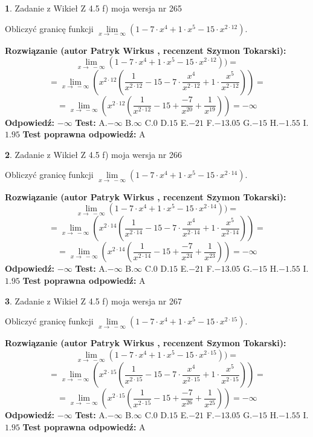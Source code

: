 \documentclass[12pt, a4paper]{article}
\theoremstyle{definition} %
\newtheorem{zad}{}
\newcommand{\zadStart}[1]{\begin{zad}#1\newline}
\newcommand{\zadStop}{\end{zad}}
\newcommand{\rozwStart}[2]{\noindent \textbf{Rozwiązanie (autor #1 , recenzent #2): }\newline}
\newcommand{\rozwStop}{\newline}
\newcommand{\odpStart}{\noindent \textbf{Odpowiedź:}\newline}
\newcommand{\odpStop}{\newline}
\newcommand{\testStart}{\noindent \textbf{Test:}\newline}
\newcommand{\testStop}{\newline}
\newcommand{\kluczStart}{\noindent \textbf{Test poprawna odpowiedź:}\newline}
\newcommand{\kluczStop}{\newline}
\begin{document}
\zadStart{Zadanie z Wikieł Z 4.5 f) moja wersja nr 265}


Obliczyć granicę funkcji  $\lim\limits_{x\to\ -\infty}(1 - 7 \cdot x^{4}+1 \cdot x^{5}- 15 \cdot x^{2\cdot12})$.
\zadStop
\rozwStart{Patryk Wirkus}{Szymon Tokarski}
$$\lim\limits_{x\to\ -\infty}(1 - 7 \cdot x^{4}+1 \cdot x^{5}- 15 \cdot x^{2\cdot12}))=$$
$$=\lim\limits_{x\to\ -\infty}(x^{2\cdot12}(\frac{1}{x^{2\cdot12}}-15 -7 \cdot \frac{x^{4}}{x^{2\cdot12}}+1 \cdot \frac{x^{5}}{x^{2\cdot12}}))=$$
$$=\lim\limits_{x\to\ -\infty}(x^{2\cdot12}(\frac{1}{x^{2\cdot12}}-15 + \frac{-7}{x^{20}}+ \frac{1}{x^{19}}))=-\infty$$
\rozwStop
\odpStart
$-\infty$
\odpStop
\testStart
A.$-\infty$ B.$\infty$ C.$0$ D.$15$ E.$-21$
F.$-13.05$ G.$-15$
H.$-1.55$
I.$1.95$
\testStop
\kluczStart
A
\kluczStop



\zadStart{Zadanie z Wikieł Z 4.5 f) moja wersja nr 266}


Obliczyć granicę funkcji  $\lim\limits_{x\to\ -\infty}(1 - 7 \cdot x^{4}+1 \cdot x^{5}- 15 \cdot x^{2\cdot14})$.
\zadStop
\rozwStart{Patryk Wirkus}{Szymon Tokarski}
$$\lim\limits_{x\to\ -\infty}(1 - 7 \cdot x^{4}+1 \cdot x^{5}- 15 \cdot x^{2\cdot14}))=$$
$$=\lim\limits_{x\to\ -\infty}(x^{2\cdot14}(\frac{1}{x^{2\cdot14}}-15 -7 \cdot \frac{x^{4}}{x^{2\cdot14}}+1 \cdot \frac{x^{5}}{x^{2\cdot14}}))=$$
$$=\lim\limits_{x\to\ -\infty}(x^{2\cdot14}(\frac{1}{x^{2\cdot14}}-15 + \frac{-7}{x^{24}}+ \frac{1}{x^{23}}))=-\infty$$
\rozwStop
\odpStart
$-\infty$
\odpStop
\testStart
A.$-\infty$ B.$\infty$ C.$0$ D.$15$ E.$-21$
F.$-13.05$ G.$-15$
H.$-1.55$
I.$1.95$
\testStop
\kluczStart
A
\kluczStop



\zadStart{Zadanie z Wikieł Z 4.5 f) moja wersja nr 267}


Obliczyć granicę funkcji  $\lim\limits_{x\to\ -\infty}(1 - 7 \cdot x^{4}+1 \cdot x^{5}- 15 \cdot x^{2\cdot15})$.
\zadStop
\rozwStart{Patryk Wirkus}{Szymon Tokarski}
$$\lim\limits_{x\to\ -\infty}(1 - 7 \cdot x^{4}+1 \cdot x^{5}- 15 \cdot x^{2\cdot15}))=$$
$$=\lim\limits_{x\to\ -\infty}(x^{2\cdot15}(\frac{1}{x^{2\cdot15}}-15 -7 \cdot \frac{x^{4}}{x^{2\cdot15}}+1 \cdot \frac{x^{5}}{x^{2\cdot15}}))=$$
$$=\lim\limits_{x\to\ -\infty}(x^{2\cdot15}(\frac{1}{x^{2\cdot15}}-15 + \frac{-7}{x^{26}}+ \frac{1}{x^{25}}))=-\infty$$
\rozwStop
\odpStart
$-\infty$
\odpStop
\testStart
A.$-\infty$ B.$\infty$ C.$0$ D.$15$ E.$-21$
F.$-13.05$ G.$-15$
H.$-1.55$
I.$1.95$
\testStop
\kluczStart
A
\kluczStop
\end{document}
